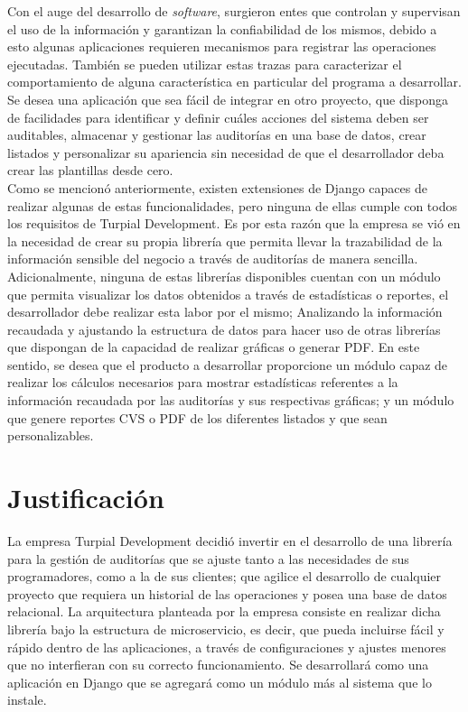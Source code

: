 Con el auge del desarrollo de \textit{software}, surgieron entes que controlan y supervisan el uso de la información y garantizan la confiabilidad de los mismos, debido a esto algunas aplicaciones requieren mecanismos para registrar las operaciones ejecutadas. También se pueden utilizar estas trazas para caracterizar el comportamiento de alguna característica en particular del programa a desarrollar.\\

Se desea una aplicación que sea fácil de integrar en otro proyecto, que disponga de facilidades para identificar y definir cuáles acciones del sistema deben ser auditables, almacenar y gestionar las auditorías en una base de datos, crear listados y personalizar su apariencia sin necesidad de que el desarrollador deba crear las plantillas desde cero.\\ 

Como se mencionó anteriormente, existen extensiones de Django capaces de realizar algunas de estas funcionalidades, pero ninguna de ellas cumple con todos los requisitos de Turpial Development. Es por esta razón que la empresa se vió en la necesidad de crear su propia librería que permita llevar la trazabilidad de la información sensible del negocio a través de auditorías de manera sencilla. \\

Adicionalmente, ninguna de estas librerías disponibles cuentan con un módulo que permita visualizar los datos obtenidos a través de estadísticas o reportes, el desarrollador debe realizar esta labor por el mismo; Analizando la información recaudada y ajustando la estructura de datos para hacer uso de otras librerías que dispongan de la capacidad de realizar gráficas o generar PDF. En este sentido, se desea que el producto a desarrollar proporcione un módulo capaz de realizar los cálculos necesarios para mostrar estadísticas referentes a la información recaudada por las auditorías y sus respectivas gráficas; y un módulo que genere reportes CVS o PDF de los diferentes listados y que sean personalizables.


\section{Justificación}

La empresa Turpial Development decidió invertir en el desarrollo de una librería para la gestión de auditorías que se ajuste tanto a las necesidades de sus programadores, como a la de sus clientes; que agilice el desarrollo de cualquier proyecto que requiera un historial de las operaciones y posea una base de datos relacional. La arquitectura planteada por la empresa consiste en realizar dicha librería bajo la estructura de microservicio, es decir, que pueda incluirse fácil y rápido dentro de las aplicaciones, a través de configuraciones y ajustes menores que no interfieran con su correcto funcionamiento. Se desarrollará como una aplicación en Django que se agregará como un módulo más al sistema que lo instale. \\

